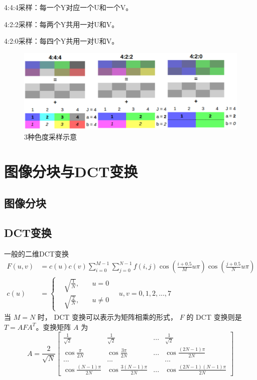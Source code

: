 4:4:4采样：每一个Y对应一个U和一个V。

4:2:2采样：每两个Y共用一对U和V。

4:2:0采样：每四个Y共用一对U和V。

\begin{figure}
    \centering
    \includegraphics[width=1.0\textwidth]{pages/jpeg/chrominance_sample.png}
    \caption{3种色度采样示意}
    \label{Fig.chrominance_sample}
\end{figure}


\section{图像分块与DCT变换}
\subsection{图像分块}
\subsection{DCT变换}

一般的二维DCT变换
\begin{equation}
    \begin{aligned}
        F(u,v) &=c(u)c(v) \sum_{i=0}^{M-1} \sum_{j=0}^{N-1} f(i,j) \cos(\frac{i+0.5}{M}u\pi) \cos(\frac{j+0.5}{N}u\pi) \\
        c(u) &=\left\{\begin{aligned}
            & \sqrt{\frac{1}{N}}, & \quad u=0 \\
            & \sqrt{\frac{2}{N}}, & \quad u\neq 0
        \end{aligned}\right.
        \quad u,v=0,1,2,...,7
    \end{aligned}
\end{equation}
当 $M=N$ 时， DCT 变换可以表示为矩阵相乘的形式， $F$ 的 DCT 变换则是 $T=AFA^T$。变换矩阵 $A$ 为
\begin{equation}
    A=\frac{2}{\sqrt{N}}
    \begin{bmatrix}
        \frac{1}{\sqrt{2}}      & \frac{1}{\sqrt{2}}        & ...   & \frac{1}{\sqrt{2}} \\
        \cos\frac{\pi}{2N}      & \cos\frac{3\pi}{2N}       & ...   & \cos\frac{(2N-1)\pi}{2N} \\
        ...                     & ...                       &       & ... \\
        \cos\frac{(N-1)\pi}{2N} & \cos\frac{3(N-1)\pi}{2N}  & ...   & \cos\frac{(2N-1)(N-1)\pi}{2N}
    \end{bmatrix}
\end{equation}




